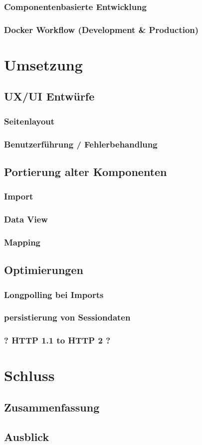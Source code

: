 \documentclass[11pt,a4paper]{article}
\begin{document}
	\subsubsection{Componentenbasierte Entwicklung}
	\subsubsection{Docker Workflow (Development \& Production)}
	
	\section{Umsetzung}
	\subsection{UX/UI Entwürfe}
	\subsubsection{Seitenlayout}
	\subsubsection{Benutzerführung / Fehlerbehandlung}
	\subsection{Portierung alter Komponenten}
	\subsubsection{Import}
	\subsubsection{Data View}
	\subsubsection{Mapping}
	\subsection{Optimierungen}
	\subsubsection{Longpolling bei Imports}
	\subsubsection{persistierung von Sessiondaten}
	\subsubsection{? HTTP 1.1 to HTTP 2 ?}
	
	
	\section{Schluss}
	\subsection{Zusammenfassung}
	\subsection{Ausblick}
	
	
	
\end{document}
